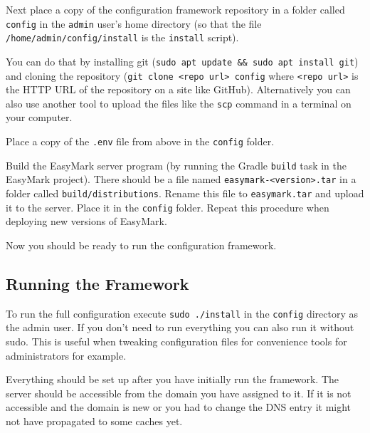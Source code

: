 \documentclass[12pt,a4paper]{report}
\begin{document}
	Next place a copy of the configuration framework repository in a folder called \lstinline|config| in the \lstinline|admin| user's home directory (so that the file \lstinline|/home/admin/config/install| is the \lstinline|install| script).

	You can do that by installing git (\lstinline|sudo apt update && sudo apt install git|) and cloning the repository (\lstinline|git clone <repo url> config| where \lstinline|<repo url>| is the HTTP URL of the repository on a site like GitHub). Alternatively you can also use another tool to upload the files like the \lstinline|scp| command in a terminal on your computer.

	Place a copy of the \lstinline|.env| file from above in the \lstinline|config| folder.

	Build the EasyMark server program (by running the Gradle \lstinline|build| task in the EasyMark project). There should be a file named \lstinline|easymark-<version>.tar| in a folder called \lstinline|build/distributions|. Rename this file to \lstinline|easymark.tar| and upload it to the server. Place it in the \lstinline|config| folder. Repeat this procedure when deploying new versions of EasyMark.

	Now you should be ready to run the configuration framework.

	\subsection{Running the Framework}
	To run the full configuration execute \lstinline|sudo ./install| in the \lstinline|config| directory as the admin user. If you don't need to run everything you can also run it without sudo. This is useful when tweaking configuration files for convenience tools for administrators for example.

	Everything should be set up after you have initially run the framework. The server should be accessible from the domain you have assigned to it. If it is not accessible and the domain is new or you had to change the DNS entry it might not have propagated to some caches yet.
\end{document}
